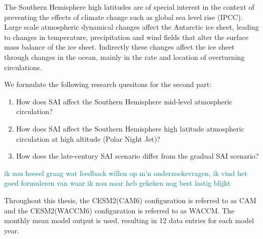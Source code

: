 The Southern Hemisphere high latitudes are of special interest in the context of preventing the effects of climate change such as global sea level rise (IPCC). Large scale atmospheric dynamical changes affect the Antarctic ice sheet, leading to changes in temperature, precipitation and wind fields that alter the surface mass balance of the ice sheet. Indirectly these changes affect the ice sheet through changes in the ocean, mainly in the rate and location of overturning circulations. %

We formulate the following research quesitons for the second part:

\begin{enumerate}
    \item How does SAI affect the Southern Hemisphere mid-level atmospheric circulation?
    \item How does SAI affect the Southern Hemisphere high latitude atmospheric circulation at high altitude (Polar Night Jet)?
    \item How does the late-century SAI scenario differ from the gradual SAI scenario?
\end{enumerate}

\textcolor{teal}{ik zou heeeel graag wat feedback willen op m'n onderzoeksvragen, ik vind het goed formuleren van waar ik nou naar heb gekeken nog best lastig blijkt}

Throughout this thesis, the CESM2(CAM6) configuration is referred to as CAM and the CESM2(WACCM6) configuration is referred to as WACCM. The monthly mean model output is used, resulting in 12 data entries for each model year. 